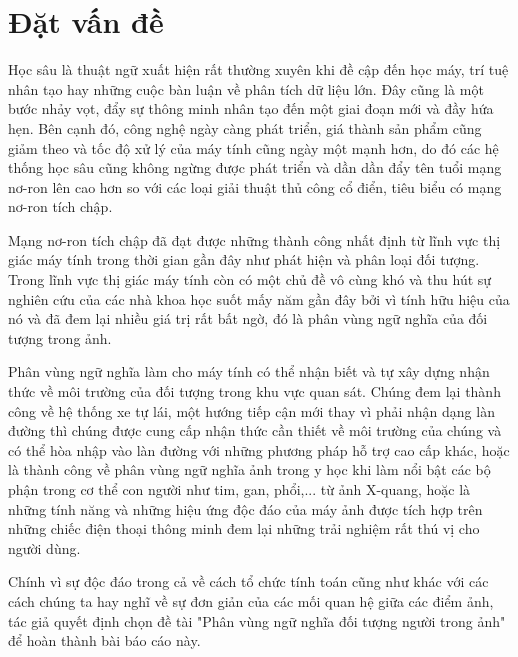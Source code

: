 \documentclass[../the.tex]{subfiles}
\begin{document}
\renewcommand*\thesection{\arabic{section}}

\section{Đặt vấn đề} 
\label{dat_van_de}
{\fontsize{13}{12} \selectfont
Học sâu là thuật ngữ xuất hiện rất thường xuyên khi đề cập đến học máy, trí tuệ nhân tạo hay những cuộc bàn luận về phân tích dữ liệu lớn. Đây cũng là một bước nhảy vọt, đẩy sự thông minh nhân tạo đến một giai đoạn mới và đầy hứa hẹn. Bên cạnh đó, công nghệ ngày càng phát triển, giá thành sản phẩm cũng giảm theo và tốc độ xử lý của máy tính cũng ngày một mạnh hơn, do đó các hệ thống học sâu cũng không ngừng được phát triển và dần dần đẩy tên tuổi mạng nơ-ron lên cao hơn so với các loại giải thuật thủ công cổ điển, tiêu biểu có mạng nơ-ron tích chập.   

Mạng nơ-ron tích chập đã đạt được những thành công nhất định từ lĩnh vực thị giác máy tính trong thời gian gần đây như phát hiện và phân loại đối tượng. Trong lĩnh vực thị giác máy tính còn có một chủ đề vô cùng khó và thu hút sự nghiên cứu của các nhà khoa học suốt mấy năm gần đây bởi vì tính hữu hiệu của nó và đã đem lại nhiều giá trị rất bất ngờ, đó là phân vùng ngữ nghĩa của đối tượng trong ảnh. 

Phân vùng ngữ nghĩa làm cho máy tính có thể nhận biết và tự xây dựng nhận thức về môi trường của đối tượng trong khu vực quan sát. Chúng đem lại thành công về hệ thống xe tự lái, một hướng tiếp cận mới thay vì phải nhận dạng làn đường thì chúng được cung cấp nhận thức cần thiết về môi trường của chúng và có thể hòa nhập vào làn đường với những phương pháp hỗ trợ cao cấp khác, hoặc là thành công về phân vùng ngữ nghĩa ảnh trong y học khi làm nổi bật các bộ phận trong cơ thể con người như tim, gan, phổi,... từ ảnh X-quang, hoặc là những tính năng và những hiệu ứng độc đáo của máy ảnh được tích hợp trên những chiếc điện thoại thông minh đem lại những trải nghiệm rất thú vị cho người dùng.

Chính vì sự độc đáo trong cả về cách tổ chức tính toán cũng như khác với các cách chúng ta hay nghĩ về sự đơn giản của các mối quan hệ giữa các điểm ảnh, tác giả quyết định chọn đề tài "Phân vùng ngữ nghĩa đối tượng người trong ảnh" để hoàn thành bài báo cáo này.  }
\end{document}
